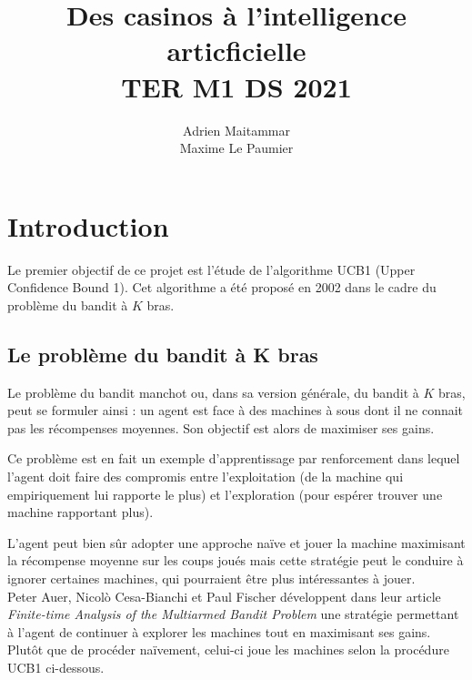 \documentclass[a4paper]{article}
\title{\huge Des casinos à l'intelligence articficielle\\[15pt] \small TER M1 DS 2021}
\author{Adrien Maitammar \\ Maxime Le Paumier}
\theoremstyle{definition}
\begin{document}
\maketitle

\vspace{30pt}

\renewcommand{\contentsname}{Sommaire}
\tableofcontents
 \clearpage
 
 
\section{Introduction}

\vspace{5pt}

Le premier objectif de ce projet est l'étude de l'algorithme UCB1 (Upper Confidence Bound 1). Cet algorithme a été proposé en 2002 dans le cadre du problème du bandit à $K$ bras.

\subsection{Le problème du bandit à K bras}

Le problème du bandit manchot ou, dans sa version générale, du bandit à $K$ bras, peut se formuler ainsi : un agent est face à des machines à sous dont il ne connait pas les récompenses moyennes. Son objectif est alors de maximiser ses gains.

Ce problème est en fait un exemple d'apprentissage par renforcement dans lequel l'agent doit faire des compromis entre l'exploitation (de la machine qui empiriquement lui rapporte le plus) et l'exploration (pour espérer trouver une machine rapportant plus).

L'agent peut bien sûr adopter une approche naïve et jouer la machine maximisant la récompense moyenne sur les coups joués mais  cette stratégie peut le conduire à ignorer certaines machines, qui pourraient être plus intéressantes à jouer. \\
 
Peter Auer, Nicol\`o Cesa-Bianchi et Paul Fischer développent dans leur article \textit{Finite-time Analysis of the Multiarmed Bandit
Problem} une stratégie permettant à l'agent de continuer à explorer les machines tout en maximisant ses gains. Plutôt que de procéder naïvement, celui-ci joue les machines selon la procédure UCB1 ci-dessous.

\vspace{10pt}
\end{document}
